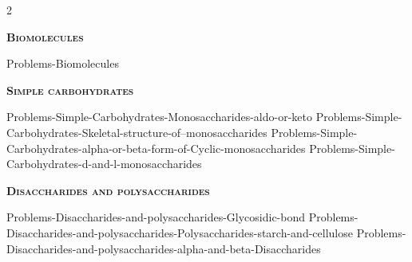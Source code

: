 \documentclass[main.tex]{subfiles}
\begin{document}
\newcommand\chapterlabel{Ch-biochemistry}
\newpage
{}
\fancyhfoffset[E,O]{0pt}
\setlength{\columnsep}{30pt}
\begin{conclusion}
\iftoggle{chem121}{}{\setcounter{chapter}{1}}
\iftoggle{chem121}{\setcounter{chapter}{10}}{}
\end{conclusion}
\begin{multicols*}{2}\setcounter{numA}{1}  %




%
%
%


{\raggedright\textsc{\textbf{Biomolecules}}\par}
 
  {Problems-Biomolecules}




{\raggedright\textsc{\textbf{Simple carbohydrates}}\par}
 
  {Problems-Simple-Carbohydrates-Monosaccharides-aldo-or-keto}
 {Problems-Simple-Carbohydrates-Skeletal-structure-of--monosaccharides}
 {Problems-Simple-Carbohydrates-alpha-or-beta-form-of-Cyclic-monosaccharides}
 {Problems-Simple-Carbohydrates-d-and-l-monosaccharides}








 
 


{\raggedright\textsc{\textbf{Disaccharides and polysaccharides}}\par}
 {Problems-Disaccharides-and-polysaccharides-Glycosidic-bond}
 {Problems-Disaccharides-and-polysaccharides-Polysaccharides-starch-and-cellulose}
 {Problems-Disaccharides-and-polysaccharides-alpha-and-beta-Disaccharides}









\end{multicols*}
\end{document}
